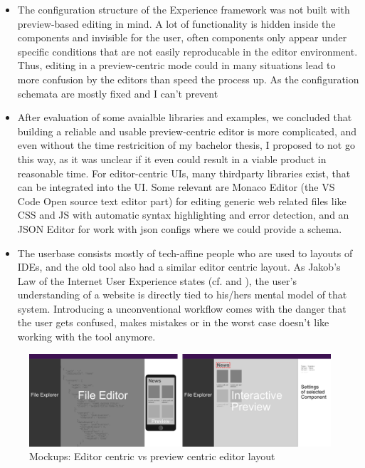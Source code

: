 \begin{itemize}
  \item The configuration structure of the Experience framework was not built with preview-based editing in mind. A lot of functionality is hidden inside the components and invisible for the user,
  often components only appear under specific conditions that are not easily reproducable in the editor environment. Thus, editing in a preview-centric mode could in many situations
  lead to more confusion by the editors than speed the process up. As the configuration schemata are mostly fixed and I can't prevent 
  \item After evaluation of some avaialble libraries and examples, we concluded that building a reliable and usable preview-centric editor is more complicated, and even without the time restricition of my bachelor thesis, I proposed to not go this way,
  as it was unclear if it even could result in a viable product in reasonable time. For editor-centric UIs, many thirdparty libraries exist, that can be integrated into the UI.
  Some relevant are Monaco Editor (the VS Code Open source text editor part) for editing generic web related files like CSS and JS with automatic syntax highlighting and error detection, and an JSON Editor for work with json configs where we could provide a schema.
  \item The userbase consists mostly of tech-affine people who are used to layouts of IDEs, and the old tool also had a similar editor centric layout.
  As Jakob's Law of the Internet User Experience states (cf. \cite{Nielsen:2000} and \cite[p. 2]{LawsOfUX:2020ys}), the user's understanding of a website is directly tied to his/hers mental model of that system.
  Introducing a unconventional workflow comes with the danger that the user gets confused, makes mistakes or in the worst case doesn't like working with the tool anymore.

\end{itemize}

\begin{figure}[h]
  \includegraphics[width=\textwidth]{pics/editor_centric_vs_preview_centric.png}
  \caption{Mockups: Editor centric vs preview centric editor layout}
\end{figure}

